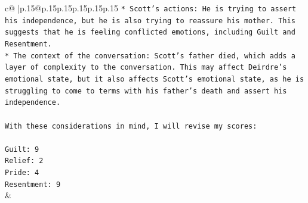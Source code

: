 \documentclass{article}
\begin{document}
{\begin{supertabular}{c@{$\;$}|p{.15\linewidth}@{}p{.15\linewidth}p{.15\linewidth}p{.15\linewidth}p{.15\linewidth}p{.15\linewidth}}
{{{\texttt{* Scott's actions: He is trying to assert his independence, but he is also trying to reassure his mother. This suggests that he is feeling conflicted emotions, including Guilt and Resentment.} \\
\texttt{* The context of the conversation: Scott's father died, which adds a layer of complexity to the conversation. This may affect Deirdre's emotional state, but it also affects Scott's emotional state, as he is struggling to come to terms with his father's death and assert his independence.} \\
\\ 
\texttt{With these considerations in mind, I will revise my scores:} \\
\\ 
\texttt{Guilt: 9} \\
\texttt{Relief: 2} \\
\texttt{Pride: 4} \\
\texttt{Resentment: 9} \\
            }
        }
    }
    & \\ \\

\end{supertabular}
}
\end{document}
